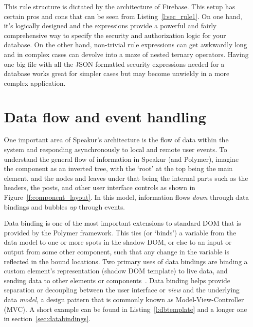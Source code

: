 This rule structure is dictated by the architecture of Firebase.
This setup has certain pros and cons that can be seen from Listing~\ref{l:sec_rule1}. 
On one hand, it's logically designed and the expressions provide a powerful and fairly comprehensive way to specify the 
security and authorization logic for your database.
On the other hand, non-trivial rule expressions can get awkwardly long and in complex cases can devolve into a maze of nested ternary operators.
Having one big file with all the JSON formatted security expressions needed for a database works great for simpler cases but may become unwieldy in a more complex application.


\section{Data flow and event handling}
One important area of Speakur's architecture is the flow of data within the system and responding asynchronously to local and remote user events.
To understand the general flow of information in Speakur (and Polymer), imagine the component as an inverted tree, with the `root' at the top being the main  element, 
and the nodes and leaves under that being the internal parts such as the headers, the posts, and other user interface controls as shown in Figure~\ref{f:component_layout}.
In this model, information flows \textit{down} through data bindings and bubbles \textit{up} through events.

Data binding is one of the most important extensions to standard DOM that is provided by the Polymer framework. 
This ties (or `binds') a variable from the data model to one or more spots in the shadow DOM, or else to an input or output from some other component, 
such that any change in the variable is reflected in the bound locations.
Two primary uses of data bindings are
binding a custom element's representation (shadow DOM template) to live data, 
and sending data to other elements or components~\cite{polymercontributors2015-b}. 
Data binding helps provide separation or decoupling between the user interface or \textit{view} and the underlying data \textit{model}, 
a design pattern that is commonly known as 
Model-View-Controller (MVC).
A short example can be found in Listing~\ref{l:dbtemplate} and a longer one in section~\ref{sec:databindings}.

